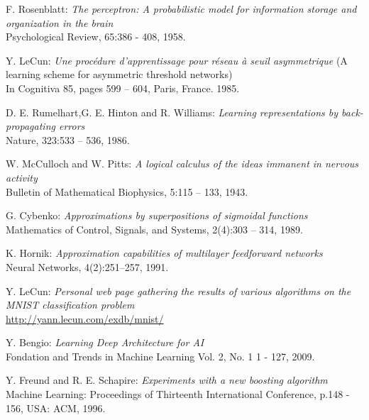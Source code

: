 \documentclass[a4paper,11pt]{report}
\begin{document}
	
\begin{thebibliography}{99}
	
	 F. Rosenblatt: {\em The perceptron: A probabilistic model for information storage and organization in the brain}\\
	Psychological Review, 65:386 - 408, 1958.  
  
	 Y. LeCun: {\em Une procédure d'apprentissage pour réseau à seuil asymmetrique} (A learning scheme for asymmetric threshold networks)\\
	In Cognitiva 85, pages 599 – 604, Paris, France. 1985.
  
	 D. E. Rumelhart,G. E. Hinton and R. Williams: {\em Learning representations by back-propagating errors}\\
  Nature, 323:533 – 536, 1986.
  
	 W. McCulloch and W. Pitts: {\em A logical calculus of the ideas immanent in nervous activity}\\
	Bulletin of Mathematical Biophysics, 5:115 – 133, 1943.
	
	 G. Cybenko: {\em Approximations by superpositions of sigmoidal functions}\\
	Mathematics of Control, Signals, and Systems, 2(4):303 – 314, 1989.
  
	 K. Hornik: {\em Approximation capabilities of multilayer feedforward networks}\\
	Neural Networks, 4(2):251–257, 1991.
  
	 Y. LeCun: {\em Personal web page gathering the results of various algorithms on the MNIST classification problem}\\
	\url{http://yann.lecun.com/exdb/mnist/}
  
	 Y. Bengio: {\em Learning Deep Architecture for AI}\\
	Fondation and Trends in Machine Learning Vol. 2, No. 1 1 - 127, 2009.
  
	 Y. Freund and R. E. Schapire: {\em Experiments with a new boosting algorithm}\\
	Machine Learning: Proceedings of Thirteenth International Conference, p.148 - 156, USA: ACM, 1996.
  

\end{thebibliography}
\end{document}
